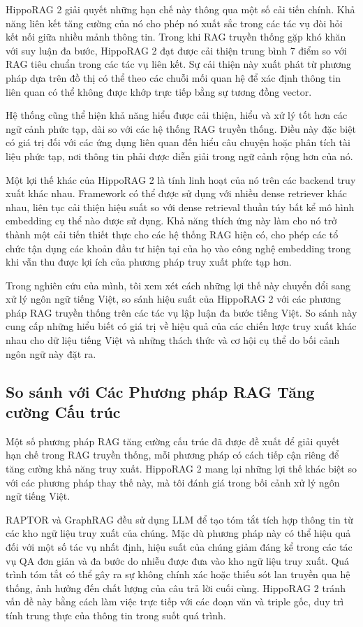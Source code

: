 \documentclass[../main.tex]{subfiles}
\begin{document}
HippoRAG 2 giải quyết những hạn chế này thông qua một số cải tiến chính. Khả năng liên kết tăng cường của nó cho phép nó xuất sắc trong các tác vụ đòi hỏi kết nối giữa nhiều mảnh thông tin. Trong khi RAG truyền thống gặp khó khăn với suy luận đa bước, HippoRAG 2 đạt được cải thiện trung bình 7 điểm so với RAG tiêu chuẩn trong các tác vụ liên kết. Sự cải thiện này xuất phát từ phương pháp dựa trên đồ thị có thể theo các chuỗi mối quan hệ để xác định thông tin liên quan có thể không được khớp trực tiếp bằng sự tương đồng vector.

Hệ thống cũng thể hiện khả năng hiểu được cải thiện, hiểu và xử lý tốt hơn các ngữ cảnh phức tạp, dài so với các hệ thống RAG truyền thống. Điều này đặc biệt có giá trị đối với các ứng dụng liên quan đến hiểu câu chuyện hoặc phân tích tài liệu phức tạp, nơi thông tin phải được diễn giải trong ngữ cảnh rộng hơn của nó.

Một lợi thế khác của HippoRAG 2 là tính linh hoạt của nó trên các backend truy xuất khác nhau. Framework có thể được sử dụng với nhiều dense retriever khác nhau, liên tục cải thiện hiệu suất so với dense retrieval thuần túy bất kể mô hình embedding cụ thể nào được sử dụng. Khả năng thích ứng này làm cho nó trở thành một cải tiến thiết thực cho các hệ thống RAG hiện có, cho phép các tổ chức tận dụng các khoản đầu tư hiện tại của họ vào công nghệ embedding trong khi vẫn thu được lợi ích của phương pháp truy xuất phức tạp hơn.

Trong nghiên cứu của mình, tôi xem xét cách những lợi thế này chuyển đổi sang xử lý ngôn ngữ tiếng Việt, so sánh hiệu suất của HippoRAG 2 với các phương pháp RAG truyền thống trên các tác vụ lập luận đa bước tiếng Việt. So sánh này cung cấp những hiểu biết có giá trị về hiệu quả của các chiến lược truy xuất khác nhau cho dữ liệu tiếng Việt và những thách thức và cơ hội cụ thể do bối cảnh ngôn ngữ này đặt ra.

\subsection{So sánh với Các Phương pháp RAG Tăng cường Cấu trúc}
Một số phương pháp RAG tăng cường cấu trúc đã được đề xuất để giải quyết hạn chế trong RAG truyền thống, mỗi phương pháp có cách tiếp cận riêng để tăng cường khả năng truy xuất. HippoRAG 2 mang lại những lợi thế khác biệt so với các phương pháp thay thế này, mà tôi đánh giá trong bối cảnh xử lý ngôn ngữ tiếng Việt.

RAPTOR và GraphRAG đều sử dụng LLM để tạo tóm tắt tích hợp thông tin từ các kho ngữ liệu truy xuất của chúng. Mặc dù phương pháp này có thể hiệu quả đối với một số tác vụ nhất định, hiệu suất của chúng giảm đáng kể trong các tác vụ QA đơn giản và đa bước do nhiễu được đưa vào kho ngữ liệu truy xuất. Quá trình tóm tắt có thể gây ra sự không chính xác hoặc thiếu sót lan truyền qua hệ thống, ảnh hưởng đến chất lượng của câu trả lời cuối cùng. HippoRAG 2 tránh vấn đề này bằng cách làm việc trực tiếp với các đoạn văn và triple gốc, duy trì tính trung thực của thông tin trong suốt quá trình.
\end{document}
